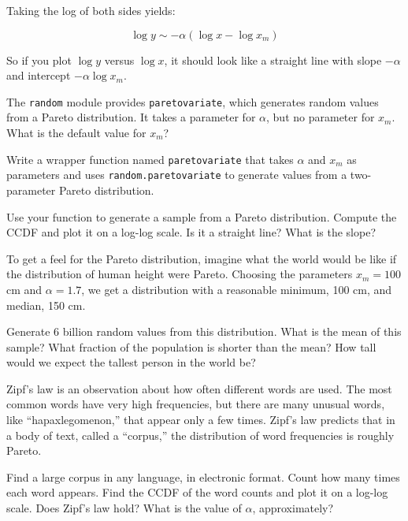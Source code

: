 \documentclass[10pt]{book}
\begin{document}
Taking the log of both sides yields:

\[ \log y \sim -\alpha (\log x - \log x_m ) \]

So if you plot $\log y$ versus $\log x$, it should look like a
straight line with slope $-\alpha$ and intercept $-\alpha \log x_m$.

\begin{ex}

The {\tt random} module provides {\tt paretovariate},
which generates random values from a Pareto distribution.  It takes
a parameter for $\alpha$, but no parameter for $x_m$.  What is
the default value for $x_m$?

Write a wrapper function named {\tt paretovariate} that takes $\alpha$
and $x_m$ as parameters and uses {\tt random.paretovariate} to
generate values from a two-parameter Pareto distribution.

Use your function to generate a sample from a Pareto distribution.
Compute the CCDF and plot it on a log-log scale.  Is it a straight
line?  What is the slope?

\end{ex}

\begin{ex}
To get a feel for the Pareto distribution, imagine what the world
would be like if the distribution of human height were Pareto.
Choosing the parameters $x_m = 100$ cm and $\alpha = 1.7$, we
get a distribution with a reasonable minimum, 100 cm,
and median, 150 cm.

Generate 6 billion random values from this distribution.  What is the
mean of this sample?  What fraction of the population is shorter than
the mean?  How tall would we expect the tallest person in the world
be?

\end{ex}

\begin{ex}

Zipf's law is an observation about how often different words are used.
The most common words have very high frequencies, but there are many
unusual words, like ``hapaxlegomenon,'' that appear only a few times.
Zipf's law predicts that in a body of text, called a ``corpus,'' the
distribution of word frequencies is roughly Pareto.

Find a large corpus in any language, in electronic
format.  Count how many times each word appears.  Find the CCDF of the
word counts and plot it on a log-log scale.  Does Zipf's law hold?
What is the value of $\alpha$, approximately?

\end{ex}
\end{document}
